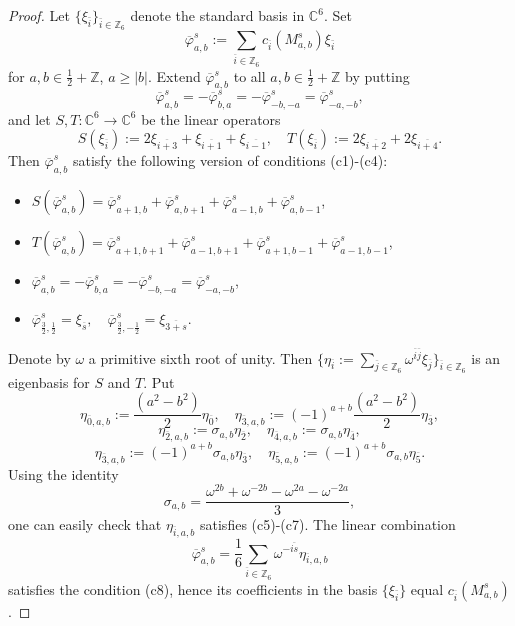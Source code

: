 \documentclass[12pt]{amsart}
\theoremstyle{plain} %
\newcommand {\ZZ} {\mathbb {Z}}
\newcommand {\CC} {\mathbb {C}}
\renewcommand{\phi}{\varphi}
\newcommand{\half}{\frac{1}{2}}
\newcommand{\threehalfs}{\frac{3}{2}}
\newcommand {\eqdef} {:=}
\begin{document}
\begin{proof}
Let $\{\xi_{\bar i}\}_{\bar i\in\ZZ_6}$ denote the standard basis in $\CC^6$. Set
\[
\overline{\phi}_{a,b}^s\eqdef\sum_{\overline{i}\in\ZZ_6}c_{\overline{i}}(M_{a,b}^s)\xi_{\bar
  i}
\]
for $a,b\in\half+\ZZ$, $a\geq |b|$. Extend $\overline{\phi}_{a,b}^s$ to all $a,b\in\half+\ZZ$ by putting
\[
\overline{\phi}_{a,b}^s =-\overline{\phi}_{b,a}^s=-\overline{\phi}_{-b,-a}^s=\overline{\phi}_{-a,-b}^s,
\]
and let $S,T:\CC^6\to \CC^6$ be the linear operators
\[
S(\xi_{\overline{i}})\eqdef 2\xi_{\overline{i+3}}+\xi_{\overline{i+1}}+\xi_{\overline{i-1}},\quad T(\xi_{\overline{i}})\eqdef 2\xi_{\overline{i+2}}+2\xi_{\overline{i+4}}.
\]
Then $\overline{\phi}_{a,b}^s$ satisfy the following version of conditions (c1)-(c4):
\begin{itemize}
\item[(c5)] $S(\overline{\phi}_{a,b}^s )=\overline{\phi}_{a+1,b}^s +\overline{\phi}_{a,b+1}^s +\overline{\phi}_{a-1,b}^s +\overline{\phi}_{a,b-1}^s$,
\item[(c6)] $T(\overline{\phi}_{a,b}^s )=\overline{\phi}_{a+1,b+1}^s +\overline{\phi}_{a-1,b+1}^s +\overline{\phi}_{a+1,b-1}^s +\overline{\phi}_{a-1,b-1}^s$,
\item[(c7)] $\overline{\phi}_{a,b}^s =-\overline{\phi}_{b,a}^s =-\overline{\phi}_{-b,-a}^s =\overline{\phi}_{-a,-b}^s $,
\item[(c8)] $\overline{\phi}_{\threehalfs,\half}^s=\xi_{\overline{s}},\quad  \overline{\phi}_{\threehalfs,-\half}^s=\xi_{\overline{3+s}}$.
\end{itemize}
Denote by $\omega$ a primitive sixth root of unity. Then $\displaystyle\{\eta_{\overline{i}}\eqdef\sum_{\overline{j}\in \ZZ_6}\omega^{\overline{i}\overline{j}}\xi_{\overline{j}}\}_{\overline{i}\in\ZZ_6}$ is an eigenbasis for $S$ and $T$.
Put
\[
\eta_{\overline{0},a,b}\eqdef \frac{(a^2-b^2)}{2}\eta_{\overline{0}},\quad \eta_{\overline{3},a,b}\eqdef (-1)^{a+b}\frac{(a^2-b^2)}{2}\eta_{\overline{3}},
\]
\[
\eta_{\overline{2},a,b}\eqdef \sigma_{a,b}\eta_{\overline{2}},\quad \eta_{\overline{4},a,b}\eqdef \sigma_{a,b}\eta_{\overline{4}},
\]
\[
\eta_{\overline{3},a,b}\eqdef (-1)^{a+b}\sigma_{a,b}\eta_{\overline{3}},\quad \eta_{\overline{5},a,b}\eqdef (-1)^{a+b}\sigma_{a,b}\eta_{\overline{5}}.
\]
Using the identity
\[
\sigma_{a,b}=\frac{\omega^{2b}+\omega^{-2b}-\omega^{2a}-\omega^{-2a}}{3},
\]
one can easily check that $\eta_{\overline{i},a,b}$ satisfies (c5)-(c7). The linear combination
\[
\overline{\phi}_{a,b}^s=\frac{1}{6}\sum_{\overline{i}\in\ZZ_6}\omega^{-\overline{is}}\eta_{\overline{i},a,b}
\]
satisfies the condition (c8), hence its coefficients in the basis
$\{\xi_{\bar i}\}$ equal $c_{\overline{i}}\left(M_{a,b}^s\right)$.
\end{proof}
\end{document}
